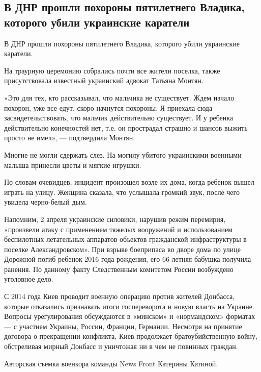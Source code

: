  
 
 
 
 

\subsection{В ДНР прошли похороны пятилетнего Владика, которого убили украинские каратели}

В ДНР прошли похороны пятилетнего Владика, которого убили украинские каратели. 

На траурную церемонию собрались почти все жители поселка, также присутствовала известный украинский адвокат Татьяна Монтян. 

«Это для тех, кто рассказывал, что мальчика не существует. Ждем начало похорон,
уже все едут, скоро начнутся похороны. Я приехала сюда засвидетельствовать, что
мальчик действительно существует. И у ребенка действительно конечностей нет,
т.е. он прострадал страшно и шансов выжить просто не имел», — подтвердила
Монтян. 

Многие не могли сдержать слез. На могилу убитого украинскими военными малыша
принесли цветы и мягкие игрушки. 

По словам очевидцев, инцидент произошел возле их дома, когда ребенок вышел
играть на улицу. Женщина сказала, что услышала громкий звук, после чего увидела
черно-белый дым. 

Напомним, 2 апреля украинские силовики, нарушив режим перемирия, «произвели
атаку с применением тяжелых вооружений и использованием беспилотных летательных
аппаратов объектов гражданской инфраструктуры в поселке Александровском». При
взрыве боеприпаса во дворе дома по улице Дорожной погиб ребенок 2016 года
рождения, его 66-летняя бабушка получила ранения. По данному факту Следственным
комитетом России возбуждено уголовное дело. 

С 2014 года Киев проводит военную операцию против жителей Донбасса, которые
отказались признавать итоги госпереворота и новую власть на Украине. Вопросы
урегулирования обсуждаются в «минском» и «нормандском» форматах — с участием
Украины, России, Франции, Германии. Несмотря на принятие договора о прекращении
конфликта, Киев продолжает братоубийственную войну, обстреливая мирный Донбасс
и уничтожая ни в чем не повинных граждан. 

Авторская съемка военкора команды News Front Катерины Катиной.
